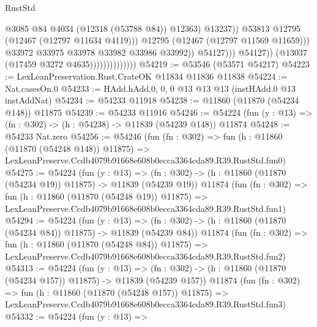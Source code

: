 \begin{lexlean}{RustStd}
\begin{coremodule}
                                                    @3085
                                                    @84
                                                    @4034
                                                    (@12318 (@53788 @84))
                                                    @12363)
                                                  @13237))
                                              @53813
                                              @12795
                                              (@12467 (@12797 @11634 @4119)))
                                            @12795
                                            (@12467 (@12797 @11569 @11659)))
                                          @33972
                                          @33975
                                          @33978
                                          @33982
                                          @33986
                                          @33992))
                                      @54127)))
                                @54127))
                            (@13037 (@17459 @3272 @4635))))))))))))))
@54219 := @53546 (@53571 @54217)
@54223 := LexLeanPreservation.Rust.CrateOK @11834 @11836 @11838
@54224 := Nat.casesOn.{0}
@54233 := HAdd.hAdd.{0, 0, 0} @13 @13 @13 (instHAdd.{0} @13 instAddNat)
@54234 := @54233 @11918
@54238 := @11860 (@11870 (@54234 @148)) @11875
@54239 := @54233 @11916
@54246 := @54224 (fun (y : @13) => (fn : @302) -> (h : @54238) -> @11839 (@54239 @148)) @11874
@54248 := @54233 Nat.zero
@54256 := @54246
    (fun (fn : @302) =>
    fun (h : @11860 (@11870 (@54248 @148)) @11875) =>
    LexLeanPreserve.Ccdb4079b91668e608b0ecca3364cda89.R39.RustStd.fun0)
@54275 := @54224
    (fun (y : @13) =>
    (fn : @302) -> (h : @11860 (@11870 (@54234 @19)) @11875) -> @11839 (@54239 @19))
    @11874
    (fun (fn : @302) =>
    fun (h : @11860 (@11870 (@54248 @19)) @11875) =>
    LexLeanPreserve.Ccdb4079b91668e608b0ecca3364cda89.R39.RustStd.fun1)
@54294 := @54224
    (fun (y : @13) =>
    (fn : @302) -> (h : @11860 (@11870 (@54234 @84)) @11875) -> @11839 (@54239 @84))
    @11874
    (fun (fn : @302) =>
    fun (h : @11860 (@11870 (@54248 @84)) @11875) =>
    LexLeanPreserve.Ccdb4079b91668e608b0ecca3364cda89.R39.RustStd.fun2)
@54313 := @54224
    (fun (y : @13) =>
    (fn : @302) -> (h : @11860 (@11870 (@54234 @157)) @11875) -> @11839 (@54239 @157))
    @11874
    (fun (fn : @302) =>
    fun (h : @11860 (@11870 (@54248 @157)) @11875) =>
    LexLeanPreserve.Ccdb4079b91668e608b0ecca3364cda89.R39.RustStd.fun3)
@54332 := @54224
    (fun (y : @13) =>

\end{coremodule}
\end{lexlean}
